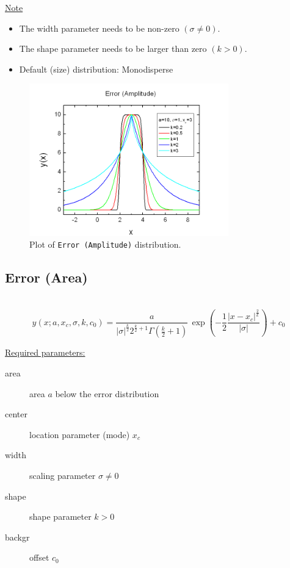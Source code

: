 \uline{Note}
\begin{itemize}
  \item The width parameter needs to be non-zero $(\sigma\neq 0)$.
  \item The shape parameter needs to be larger than zero $(k>0)$.
  \item Default (size) distribution: Monodisperse
\end{itemize}
\begin{figure}[htb]
\begin{center}
\includegraphics[width=0.768\textwidth]{ErrorAmplitude.png}
\end{center}
\caption{Plot of \texttt{Error (Amplitude)} distribution.}
\label{fig:ErrorAmplitude}
\end{figure}

\clearpage
\subsection{Error (Area)} ~\\
\label{sec:ErrorPeakArea}
\begin{equation}
y(x;a,x_c,\sigma,k,c_0) = \frac{a}{\left|\sigma\right|^{\frac{k}{2}}2^{\frac{k}{2}+1}\Gamma\left(\frac{k}{2}+1\right)}
\, \exp\left(-\frac{1}{2}\frac{\left|x-x_c\right|^{\frac{2}{k}}}{\left|\sigma\right|}\right)+c_0
\end{equation}
\vspace{5mm}
\vspace{5mm}

\uline{Required parameters:}
\begin{description}
    \item[area] area $a$ below the error distribution
    \item[center] location parameter (mode) $x_c$
    \item[width] scaling parameter $\sigma\neq 0$
    \item[shape] shape parameter $k>0$
    \item[backgr] offset $c_0$
\end{description}

